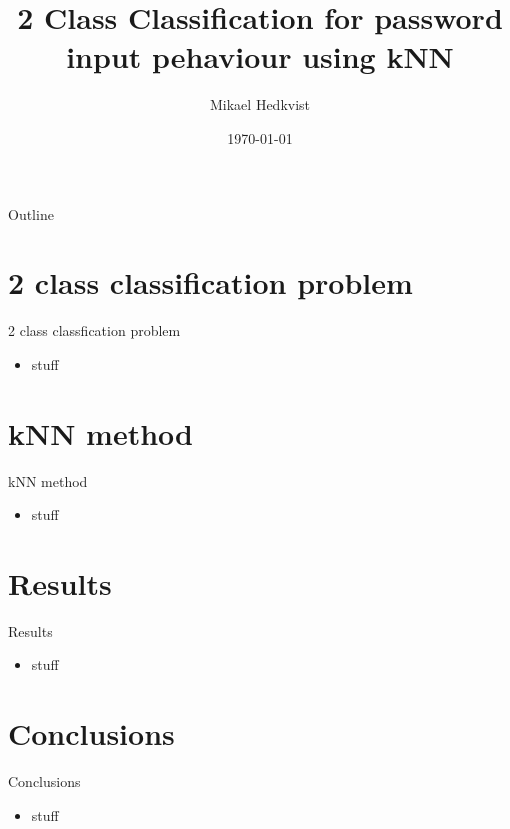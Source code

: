 \documentclass{beamer}
\title[D7041E]{2 Class Classification for password input pehaviour using kNN}
\author{Mikael Hedkvist}
\institute{}
\date{\today}
\begin{document}
\begin{frame}
\titlepage
\end{frame}

\begin{frame}{Outline}
\tableofcontents
\end{frame}

\section{2 class classification problem}
\begin{frame}{2 class classfication problem}
	\begin{itemize}
		\item stuff
	\end{itemize}
\end{frame}

\section{kNN method}
\begin{frame}{kNN method}
	\begin{itemize}
		\item stuff
	\end{itemize}
\end{frame}

\section{Results}
\begin{frame}{Results}
	\begin{itemize}
		\item stuff
	\end{itemize}
\end{frame}

\section{Conclusions}
\begin{frame}{Conclusions}
	\begin{itemize}
		\item stuff
	\end{itemize}
\end{frame}
\end{document}
